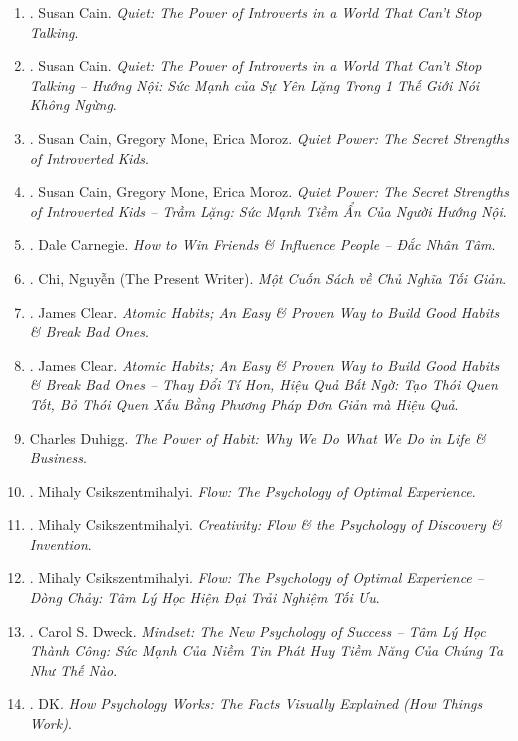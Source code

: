 \documentclass{article}
\begin{document}
\begin{enumerate}
	\item \cite{Cain2013}. Susan Cain. {\it Quiet: The Power of Introverts in a World That Can't Stop Talking}.\hfill{\sf[reading]}
	\item \cite{Cain2022}. Susan Cain. {\it Quiet: The Power of Introverts in a World That Can't Stop Talking -- Hướng Nội: Sức Mạnh của Sự Yên Lặng Trong 1 Thế Giới Nói Không Ngừng}.\hfill{\sf[done]}
	\item \cite{Cain_Mone_Moroz2017}. Susan Cain, Gregory Mone, Erica Moroz. {\it Quiet Power: The Secret Strengths of Introverted Kids}.\hfill{\sf[reading]}
	\item \cite{Cain_Mone_Moroz2023}. Susan Cain, Gregory Mone, Erica Moroz. {\it Quiet Power: The Secret Strengths of Introverted Kids -- Trầm Lặng: Sức Mạnh Tiềm Ẩn Của Người Hướng Nội}.\hfill{\sf[done]}
	\item \cite{Carnegie2021}. Dale Carnegie. {\it How to Win Friends \& Influence People -- Đắc Nhân Tâm}.\hfill{\sf[done]}
	\item \cite{Chi2022}. Chi, Nguyễn (The Present Writer). {\it Một Cuốn Sách về Chủ Nghĩa Tối Giản}. \hfill{\sf[done]}
	\item \cite{Clear2018}. James Clear. {\it Atomic Habits; An Easy \& Proven Way to Build Good Habits \& Break Bad Ones}.\hfill{\sf[reading]}
	\item \cite{Clear2022}. James Clear. {\it Atomic Habits; An Easy \& Proven Way to Build Good Habits \& Break Bad Ones -- Thay Đổi Tí Hon, Hiệu Quả Bất Ngờ: Tạo Thói Quen Tốt, Bỏ Thói Quen Xấu Bằng Phương Pháp Đơn Giản mà Hiệu Quả}.\hfill{\sf[done]}
	\item Charles Duhigg. {\it The Power of Habit: Why We Do What We Do in Life \& Business}.
	\item \cite{Csikszentmihalyi2008}. Mihaly Csikszentmihalyi. {\it Flow: The Psychology of Optimal Experience}.\hfill{\sf[reading]}
	\item \cite{Csikszentmihalyi2013}. Mihaly Csikszentmihalyi. {\it Creativity: Flow \& the Psychology of Discovery \& Invention}.\hfill{\sf[reading]}
	\item \cite{Csikszentmihalyi2021}. Mihaly Csikszentmihalyi. {\it Flow: The Psychology of Optimal Experience -- Dòng Chảy: Tâm Lý Học Hiện Đại Trải Nghiệm Tối Ưu}.\hfill{\sf[done]}
	\item \cite{Dweck_mindset}. Carol S. Dweck. {\it Mindset: The New Psychology of Success -- Tâm Lý Học Thành Công: Sức Mạnh Của Niềm Tin Phát Huy Tiềm Năng Của Chúng Ta Như Thế Nào}.\hfill\hfill{\sf[done]}
	\item \cite{DK2018}. DK. {\it How Psychology Works: The Facts Visually Explained (How Things Work)}.\hfill{\sf[reading]} 

\end{enumerate}
\end{document}

